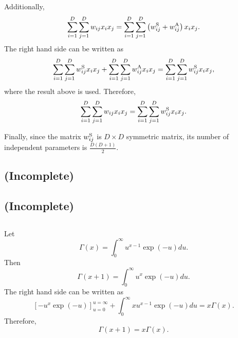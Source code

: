 Additionally,
%
\begin{equation}
\sum_{i = 1}^{D} \sum_{j = 1}^{D} w_{ij} x_i x_j = \sum_{i = 1}^{D} \sum_{j = 1}^{D} \left( w_{ij}^{\rm S} + w_{ij}^{\rm A} \right) x_i x_j.
\end{equation}
%
The right hand side can be written as
%
\begin{equation}
\sum_{i = 1}^{D} \sum_{j = 1}^{D} w_{ij}^{\rm S} x_i x_j + \sum_{i = 1}^{D} \sum_{j = 1}^{D} w_{ij}^{\rm A} x_i x_j = \sum_{i = 1}^{D} \sum_{j = 1}^{D} w_{ij}^{\rm S} x_i x_j,
\end{equation}
%
where the result above is used. 
Therefore,
%
\begin{equation}
\sum_{i = 1}^{D} \sum_{j = 1}^{D} w_{ij} x_i x_j = \sum_{i = 1}^{D} \sum_{j = 1}^{D} w_{ij}^{\rm S} x_i x_j.
\end{equation}
%

Finally, since the matrix $w_{ij}^{\rm S}$ is $D \times D$ symmetric matrix, its number of independent parameters is $\frac{D (D + 1)}{2}$.


\subsection{(Incomplete)}


\subsection{(Incomplete)}


\subsection{}
Let
%
\begin{equation}
\Gamma(x) = \int_{0}^{\infty} u ^ {x - 1} \exp(- u) du.
\end{equation}
%
Then
%
\begin{equation}
\Gamma(x + 1) = \int_{0}^{\infty} u ^ {x} \exp(- u) du.
\end{equation}
%
The right hand side can be written as 
%
\begin{equation}
\left[ - u ^ x \exp(- u) \right]_{u = 0}^{u = \infty} + \int_{0}^{\infty} x u ^ {x - 1} \exp(- u) du = x \Gamma(x).
\end{equation}
%
Therefore,
%
\begin{equation}
\Gamma( x + 1) = x \Gamma(x).
\end{equation}
%

